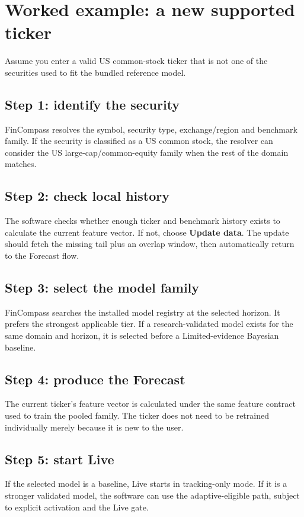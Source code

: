 \documentclass[11pt]{article}
\begin{document}
\section{Worked example: a new supported ticker}
Assume you enter a valid US common-stock ticker that is not one of the securities used to fit the bundled reference model.

\subsection{Step 1: identify the security}
FinCompass resolves the symbol, security type, exchange/region and benchmark family. If the security is classified as a US common stock, the resolver can consider the US large-cap/common-equity family when the rest of the domain matches.

\subsection{Step 2: check local history}
The software checks whether enough ticker and benchmark history exists to calculate the current feature vector. If not, choose \textbf{Update data}. The update should fetch the missing tail plus an overlap window, then automatically return to the Forecast flow.

\subsection{Step 3: select the model family}
FinCompass searches the installed model registry at the selected horizon. It prefers the strongest applicable tier. If a research-validated model exists for the same domain and horizon, it is selected before a Limited-evidence Bayesian baseline.

\subsection{Step 4: produce the Forecast}
The current ticker's feature vector is calculated under the same feature contract used to train the pooled family. The ticker does not need to be retrained individually merely because it is new to the user.

\subsection{Step 5: start Live}
If the selected model is a baseline, Live starts in tracking-only mode. If it is a stronger validated model, the software can use the adaptive-eligible path, subject to explicit activation and the Live gate.
\end{document}
